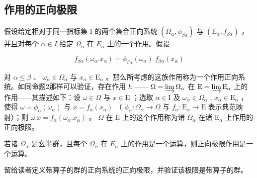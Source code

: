 \subsection{作用的正向极限}

假设给定相对于同一指标集 I 的两个集合正向系统 \((\Omega_{\alpha}, \phi_{\beta\alpha})\) 与 \((\mathrm{E}_{\alpha}, f_{\beta\alpha})\) ，并且对每个 \(\alpha \in I\) 给定 \(\Omega_{\alpha}\) 在 \(E_{\alpha}\) 上的一个作用。假设

\[
f _ {\beta \alpha} (\omega_ {\alpha}. x _ {\alpha}) = \phi_ {\beta \alpha} (\omega_ {\alpha}). f _ {\beta \alpha} (x _ {\alpha})
\]

对 \(\alpha \leqslant \beta\) 、 \(\omega_{\alpha} \in \Omega_{\alpha}\) 与 \(x_{\alpha} \in \mathrm{E}_{\alpha}\) 。那么所考虑的这族作用称为一个作用正向系统。如同命题2那样可以验证，存在作用 \(h\) —— \(\Omega = \varinjlim \Omega_{\alpha}\) 在 \(\mathrm{E} = \varinjlim \mathrm{E}_{\alpha}\) 上的作用——其描述如下：设 \(\omega \in \Omega\) 与 \(x \in \mathrm{E}\) ；选取 \(\alpha \in \mathrm{I}\) 及 \(\omega_{\alpha} \in \Omega_{\alpha}\) , \(x_{\alpha} \in \mathrm{E}_{\alpha}\) ，使得 \(\omega = \phi_{\alpha}(\omega_{\alpha})\) 与 \(x = f_{\alpha}(x_{\alpha})\) （ \(\phi_{\alpha}: \Omega_{\alpha} \to \Omega\) 与 \(f_{\alpha}: \mathrm{E}_{\alpha} \to \mathrm{E}\) 表示典范映射）；则 \(\omega . x = f_{\alpha}(\omega_{\alpha}. x_{\alpha})\) 。 \(\Omega\) 在 \(\mathrm{E}\) 上的这个作用称为诸 \(\Omega_{\alpha}\) 在诸 \(\mathrm{E}_{\alpha}\) 上作用的正向极限。

若诸 \(\Omega_{\alpha}\) 是幺半群，且每个 \(\Omega_{\alpha}\) 在 \(E_{\alpha}\) 上的作用是一个运算，则正向极限作用是一个运算。

留给读者定义带算子的群的正向系统的正向极限，并验证该极限是带算子的群。

